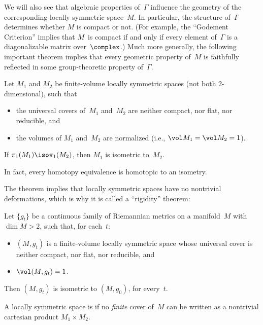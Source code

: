 We will also see that algebraic properties of~$\Gamma$ influence the geometry of the corresponding locally symmetric space~$M$. 
In particular, the structure of~$\Gamma$ determines whether $M$ is compact or not.
(For example, the ``Godement Criterion''  implies that $M$~is compact if and only if every element of~$\Gamma$ is a diagonalizable matrix over~$\complex$.)
Much more generally, the following important theorem implies that
every geometric property of~$M$ is faithfully reflected in some
group-theoretic property of~$\Gamma$. 

\begin{thm} \label{MostowIrred}
 Let $M_1$ and $M_2$ be finite-volume locally symmetric spaces\/ \textup(not both $2$-dimensional\/\textup), such
that
 \begin{itemize}
 \item the universal covers of~$M_1$ and~$M_2$ are neither compact,
nor flat, nor reducible,
and
\item the volumes of $M_1$ and~$M_2$ are normalized\/ \textup(i.e., $\vol M_1 = \vol M_2 = 1$\textup).
 \end{itemize}
  If\/ $\pi_1(M_1) \iso \pi_1(M_2)$, then $M_1$ is isometric to~$M_2$.

 In fact, every homotopy equivalence is homotopic to an isometry.
 \end{thm}

The theorem implies that locally symmetric spaces
have no nontrivial deformations, which is why it is called a ``rigidity'' theorem:

\begin{cor}
Let $\{g_t\}$ be a continuous family of Riemannian metrics on a manifold~$M$ with\/ $\dim M > 2$, such that, for each~$t$:
	\begin{itemize}
	\item $(M,g_t)$ is a finite-volume locally symmetric space  whose universal cover is neither compact, nor flat, nor reducible,
	and
	\item $\vol(M,g_t) = 1$.
	\end{itemize}
Then $(M,g_t)$ is isometric to $(M,g_0)$, for every~$t$.
\end{cor}

\begin{defn}
 A locally symmetric space is  if no \emph{finite} cover of~$M$ can be
written as a nontrivial cartesian product $M_1 \times M_2$.
 \end{defn}

